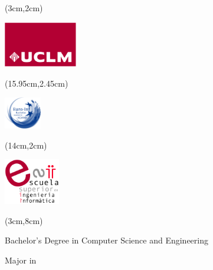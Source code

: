 %
% 


\cleardoublepage
\setcounter{page}{1} \null

\begin{textblock*}{3cm}(3cm,2cm) 
\begin{flushleft}
\includegraphics[height=2cm]{figs/logouclm.png}
\end{flushleft}
\end{textblock*}


\begin{textblock*}{2.5cm}(15.95cm,2.45cm) 
\begin{flushright}
\includegraphics[height=1.4cm]{figs/euroinf.jpg}
\end{flushright}
\end{textblock*}

\begin{textblock*}{2cm}(14cm,2cm)  %
\begin{flushright}
\includegraphics[height=2cm]{figs/logoesii.png}
\end{flushright}
\end{textblock*}



\begin{textblock*}{\textwidth}(3cm,8cm) 
\begin{center}\doublespacing 
{\fontsize{18pt}{4pt}\selectfont {}}

\medskip
{\fontsize{18pt}{4pt}\selectfont Bachelor's Degree in Computer Science and Engineering}

\medskip
{\fontsize{16pt}{4pt}\selectfont Major in \espec}
\end{center}
\end{textblock*}


